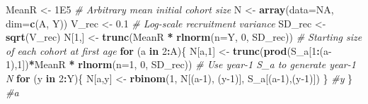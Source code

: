 \documentclass[
]{krantz}
\makeatletter
\newenvironment{Shaded}{\begin{snugshade}}{\end{snugshade}}
\newcommand{\AttributeTok}[1]{\textcolor[rgb]{0.27,0.27,0.27}{#1}}
\newcommand{\CommentTok}[1]{\textcolor[rgb]{0.37,0.37,0.37}{\textit{#1}}}
\newcommand{\ConstantTok}[1]{\textcolor[rgb]{0.37,0.37,0.37}{#1}}
\newcommand{\ControlFlowTok}[1]{\textcolor[rgb]{0.27,0.27,0.27}{\textbf{#1}}}
\newcommand{\DecValTok}[1]{\textcolor[rgb]{0.06,0.06,0.06}{#1}}
\newcommand{\FloatTok}[1]{\textcolor[rgb]{0.06,0.06,0.06}{#1}}
\newcommand{\FunctionTok}[1]{\textcolor[rgb]{0.27,0.27,0.27}{\textbf{#1}}}
\newcommand{\NormalTok}[1]{#1}
\newcommand{\OtherTok}[1]{\textcolor[rgb]{0.37,0.37,0.37}{#1}}
\newcommand{\SpecialCharTok}[1]{\textcolor[rgb]{0.43,0.43,0.43}{\textbf{#1}}}
\newenvironment{kframe}{%
\medskip{}
\setlength{\fboxsep}{.8em}
 \def\at@end@of@kframe{}%
 \ifinner\ifhmode%
  \def\at@end@of@kframe{\end{minipage}}%
  \begin{minipage}{\columnwidth}%
 \fi\fi%
 \def\FrameCommand##1{\hskip\@totalleftmargin \hskip-\fboxsep
 \colorbox{shadecolor}{##1}\hskip-\fboxsep
     \hskip-\linewidth \hskip-\@totalleftmargin \hskip\columnwidth}%
 \MakeFramed {\advance\hsize-\width
   \@totalleftmargin\z@ \linewidth\hsize
   \@setminipage}}%
 {\par\unskip\endMakeFramed%
 \at@end@of@kframe}
\renewenvironment{Shaded}{\begin{kframe}}{\end{kframe}}
\makeatother
\begin{document}
\begin{Shaded}
\begin{Highlighting}[]
\NormalTok{MeanR }\OtherTok{\textless{}{-}} \FloatTok{1E5} \CommentTok{\# Arbitrary mean initial cohort size}
\NormalTok{N }\OtherTok{\textless{}{-}} \FunctionTok{array}\NormalTok{(}\AttributeTok{data=}\ConstantTok{NA}\NormalTok{, }\AttributeTok{dim=}\FunctionTok{c}\NormalTok{(A, Y))}
\NormalTok{V\_rec }\OtherTok{\textless{}{-}} \FloatTok{0.1} \CommentTok{\# Log{-}scale recruitment variance}
\NormalTok{SD\_rec }\OtherTok{\textless{}{-}} \FunctionTok{sqrt}\NormalTok{(V\_rec)}
\NormalTok{N[}\DecValTok{1}\NormalTok{,] }\OtherTok{\textless{}{-}} \FunctionTok{trunc}\NormalTok{(MeanR }\SpecialCharTok{*} \FunctionTok{rlnorm}\NormalTok{(}\AttributeTok{n=}\NormalTok{Y, }\DecValTok{0}\NormalTok{, SD\_rec)) }
\CommentTok{\# Starting size of each cohort at first age}
\ControlFlowTok{for}\NormalTok{ (a }\ControlFlowTok{in} \DecValTok{2}\SpecialCharTok{:}\NormalTok{A)\{}
\NormalTok{  N[a,}\DecValTok{1}\NormalTok{] }\OtherTok{\textless{}{-}} \FunctionTok{trunc}\NormalTok{(}\FunctionTok{prod}\NormalTok{(S\_a[}\DecValTok{1}\SpecialCharTok{:}\NormalTok{(a}\DecValTok{{-}1}\NormalTok{),}\DecValTok{1}\NormalTok{])}\SpecialCharTok{*}\NormalTok{MeanR }\SpecialCharTok{*} \FunctionTok{rlnorm}\NormalTok{(}\AttributeTok{n=}\DecValTok{1}\NormalTok{, }\DecValTok{0}\NormalTok{, SD\_rec))}
  \CommentTok{\# Use year{-}1 S\_a to generate year{-}1 N}
  \ControlFlowTok{for}\NormalTok{ (y }\ControlFlowTok{in} \DecValTok{2}\SpecialCharTok{:}\NormalTok{Y)\{}
\NormalTok{    N[a,y] }\OtherTok{\textless{}{-}} \FunctionTok{rbinom}\NormalTok{(}\DecValTok{1}\NormalTok{, N[(a}\DecValTok{{-}1}\NormalTok{), (y}\DecValTok{{-}1}\NormalTok{)], S\_a[(a}\DecValTok{{-}1}\NormalTok{),(y}\DecValTok{{-}1}\NormalTok{)])}
\NormalTok{  \} }\CommentTok{\#y}
\NormalTok{\} }\CommentTok{\#a}


\end{Highlighting}
\end{Shaded}
\end{document}

